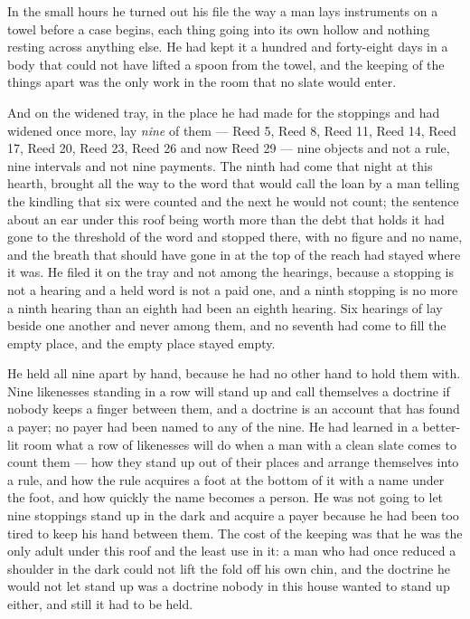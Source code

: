 \scenebreak

In the small hours he turned out his file the way a man lays instruments on a towel before a case begins, each thing going into its own hollow and nothing resting across anything else. He had kept it a hundred and forty-eight days in a body that could not have lifted a spoon from the towel, and the keeping of the things apart was the only work in the room that no slate would enter.

And on the widened tray, in the place he had made for the stoppings and had widened once more, lay \emph{nine} of them --- Reed 5, Reed 8, Reed 11, Reed 14, Reed 17, Reed 20, Reed 23, Reed 26 and now Reed 29 --- nine objects and not a rule, nine intervals and not nine payments. The ninth had come that night at this hearth, brought all the way to the word that would call the loan by a man telling the kindling that six were counted and the next he would not count; the sentence about an ear under this roof being worth more than the debt that holds it had gone to the threshold of the word and stopped there, with no figure and no name, and the breath that should have gone in at the top of the reach had stayed where it was. He filed it on the tray and not among the hearings, because a stopping is not a hearing and a held word is not a paid one, and a ninth stopping is no more a ninth hearing than an eighth had been an eighth hearing. Six hearings of  lay beside one another and never among them, and no seventh had come to fill the empty place, and the empty place stayed empty.

He held all nine apart by hand, because he had no other hand to hold them with. Nine likenesses standing in a row will stand up and call themselves a doctrine if nobody keeps a finger between them, and a doctrine is an account that has found a payer; no payer had been named to any of the nine. He had learned in a better-lit room what a row of likenesses will do when a man with a clean slate comes to count them --- how they stand up out of their places and arrange themselves into a rule, and how the rule acquires a foot at the bottom of it with a name under the foot, and how quickly the name becomes a person. He was not going to let nine stoppings stand up in the dark and acquire a payer because he had been too tired to keep his hand between them. The cost of the keeping was that he was the only adult under this roof and the least use in it: a man who had once reduced a shoulder in the dark could not lift the fold off his own chin, and the doctrine he would not let stand up was a doctrine nobody in this house wanted to stand up either, and still it had to be held.

